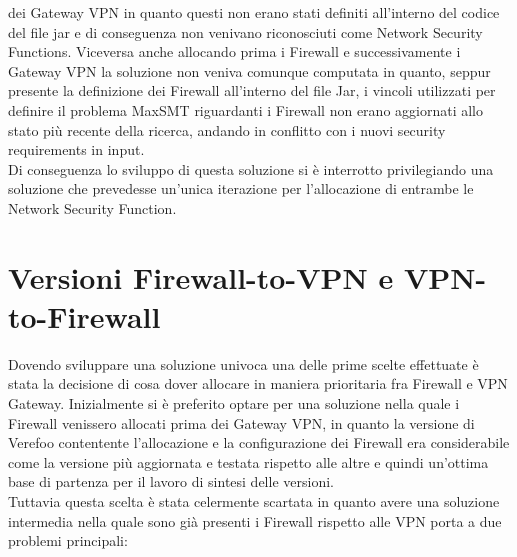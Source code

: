 dei Gateway VPN in quanto questi non erano stati definiti all'interno del codice del file jar e di conseguenza non venivano riconosciuti come Network Security Functions. Viceversa anche allocando prima i Firewall e successivamente i Gateway VPN la soluzione non veniva comunque computata in quanto, seppur presente la definizione dei Firewall all'interno del file Jar,
i vincoli utilizzati per definire il problema MaxSMT riguardanti i Firewall non erano aggiornati allo stato più recente della ricerca, andando in conflitto con i nuovi security requirements in input.\\
Di conseguenza lo sviluppo di questa soluzione si è interrotto privilegiando una soluzione che prevedesse un'unica iterazione per l'allocazione di entrambe le Network Security Function.

\section{Versioni Firewall-to-VPN e VPN-to-Firewall}

Dovendo sviluppare una soluzione univoca una delle prime scelte effettuate è stata la decisione di cosa dover allocare in maniera prioritaria fra Firewall e VPN Gateway\cite{cit6}.
Inizialmente si è preferito optare per una soluzione nella quale i Firewall venissero allocati prima dei Gateway VPN, in quanto la versione di Verefoo contentente l'allocazione e la configurazione dei Firewall era considerabile come la versione più aggiornata e testata rispetto alle altre e quindi un'ottima base di partenza per il lavoro di sintesi delle versioni.\\
Tuttavia questa scelta è stata celermente scartata in quanto avere una soluzione intermedia nella quale sono già presenti i Firewall rispetto alle VPN porta a due problemi principali:

